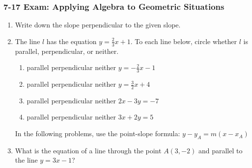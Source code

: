 \documentclass[12pt, twoside]{article}
\begin{document}
\subsubsection*{7-17 Exam: Applying Algebra to Geometric Situations}
  \begin{enumerate}

  \item Write down the slope perpendicular to the given slope. \vspace{0.5cm}
    \begin{enumerate}
    \end{enumerate}

  \item The line $l$ has the equation $y=\frac{2}{3}x+1$. To each line below, circle whether $l$ is parallel, perpendicular, or neither.
    \begin{enumerate}
      \item parallel \quad perpendicular \quad neither \qquad $y=-\frac{2}{3}x-1$
      \vspace{0.5cm}
      \item parallel \quad perpendicular \quad neither \qquad $y=\frac{3}{2}x+4$
      \vspace{0.5cm}
      \item parallel \quad perpendicular \quad neither \qquad $2x-3y=-7$
      \vspace{1.5cm}
      \item parallel \quad perpendicular \quad neither \qquad $3x+2y=5$
      \vspace{1.7cm}
    \end{enumerate}

  In the following problems, use the point-slope formula: $y-y_A=m (x-x_A)$
    \item What is the equation of a line through the point $A(3,-2)$ and parallel to the line $y=3x-1$?  \vspace{1.5cm}


\end{enumerate}
\end{document}
